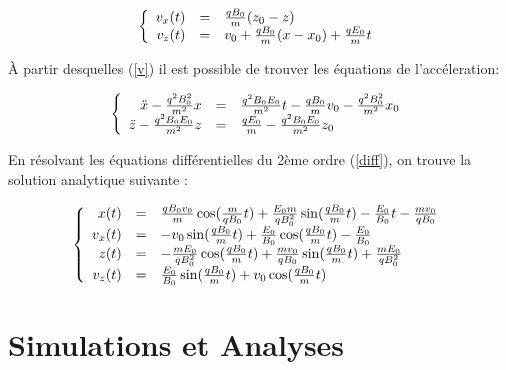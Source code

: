 \documentclass[a4paper,12pt,twoside]{article}
\begin{document}
			\begin{equation}\label{v}
				\left \{
				\begin{array}{r c l}
					v_x(t) & = & \frac{qB_0}{m}(z_0 - z)\\
					v_z(t) & = & v_0 + \frac{qB_0}{m}(x-x_0) + \frac{qE_0}{m}t\\
				\end{array}
				\right .
			\end{equation}
			
		\`A partir desquelles (\ref{v}) il est possible de trouver les \'equations de l'acc\'eleration:
		
			\begin{equation} \label{diff}
				\left \{
				\begin{array}{r c l}
					\ddot{x} - \frac{q^2B_0^2}{m^2}x & = & \frac{q^2B_0E_0}{m^2}t-\frac{qB_0 }{m}v_0 - \frac{q^2B_0^2}{m^2}x_0\\
					
					\ddot{z} -\frac{q^2B_0E_0}{m^2}z& = &  \frac{qE_0}{m} -\frac{q^2B_0E_0}{m^2}z_0\\
				\end{array}
				\right .
			\end{equation}
	
	En r\'esolvant les \'equations diff\'erentielles du 2\`eme ordre (\ref{diff}), on trouve la solution analytique suivante :
	
		\begin{equation} 
			\left \{
			\begin{array}{r c l}
				x(t) & = & \frac{qB_0v_0}{m} \cos(\frac{m}{qB_0}t) + \frac{E_0m}{qB_0^2} \sin(\frac{qB_0}{m}t) -\frac{E_0}{B_0}t - \frac{mv_0}{qB_0} \\
				v_x(t) & = & - v_0 \sin(\frac{qB_0}{m}t) + \frac{E_0}{B_0} \cos(\frac{qB_0}{m}t) -\frac{E_0}{B_0} \\
				z(t) & = & -\frac{mE_0}{qB_0^2} \cos(\frac{qB_0}{m}t) + \frac{mv_0}{qB_0} \sin(\frac{qB_0}{m}t) + \frac{mE_0}{qB_0^2}\\
				v_z(t) & = & \frac{E_0}{B_0} \sin(\frac{qB_0}{m}t) + v_0\cos(\frac{qB_0}{m}t)
			\end{array}
			\right .
		\end{equation}
	



\section{Simulations et Analyses}
\end{document}
